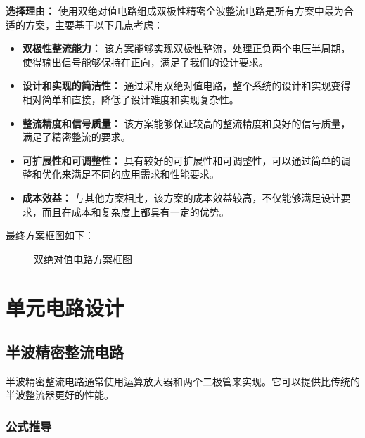 \documentclass[UTF8,titlepage,a4paper]{ctexart}
\numberwithin{figure}{section}
\begin{document}
\textbf{选择理由：} 使用双绝对值电路组成双极性精密全波整流电路是所有方案中最为合适的方案，主要基于以下几点考虑：
\begin{itemize}
    \item \textbf{双极性整流能力：} 该方案能够实现双极性整流，处理正负两个电压半周期，使得输出信号能够保持在正向，满足了我们的设计要求。
    \item \textbf{设计和实现的简洁性：} 通过采用双绝对值电路，整个系统的设计和实现变得相对简单和直接，降低了设计难度和实现复杂性。
    \item \textbf{整流精度和信号质量：} 该方案能够保证较高的整流精度和良好的信号质量，满足了精密整流的要求。
    \item \textbf{可扩展性和可调整性：} 具有较好的可扩展性和可调整性，可以通过简单的调整和优化来满足不同的应用需求和性能要求。
    \item \textbf{成本效益：} 与其他方案相比，该方案的成本效益较高，不仅能够满足设计要求，而且在成本和复杂度上都具有一定的优势。
\end{itemize}

最终方案框图如下：

\begin{figure}[H]
\centering
 \caption{双绝对值电路方案框图}
 \label{}
\end{figure}

\section{单元电路设计}
\subsection{半波精密整流电路}

半波精密整流电路通常使用运算放大器和两个二极管来实现。它可以提供比传统的半波整流器更好的性能。
\subsubsection{公式推导}
\end{document}
